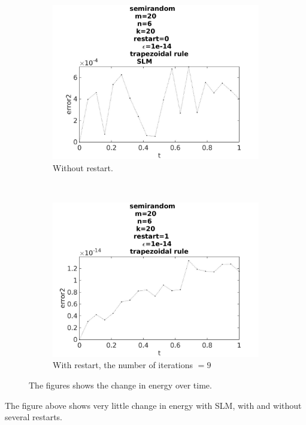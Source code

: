 \begin{figure}[H]
        \begin{subfigure}[b]{0.45\textwidth}
                \includegraphics[width=\textwidth]{../MATLAB/fig/errortestrestart02.jpg}
                \caption{ Without restart. }
                \label{fig:energytestrestart02}
        \end{subfigure}
        ~
        \begin{subfigure}[b]{0.45\textwidth}
                \includegraphics[width=\textwidth]{../MATLAB/fig/errortestrestart12.jpg}
                \caption{ With restart, the number of iterations $= 9$ }
                \label{fig:energytestrestart12}
        \end{subfigure}
        \caption{ The figures shows the change in energy over time.}
        \label{fig:energytestrestart2}
\end{figure}
The figure above shows very little change in energy with SLM, with and without several restarts. \\


